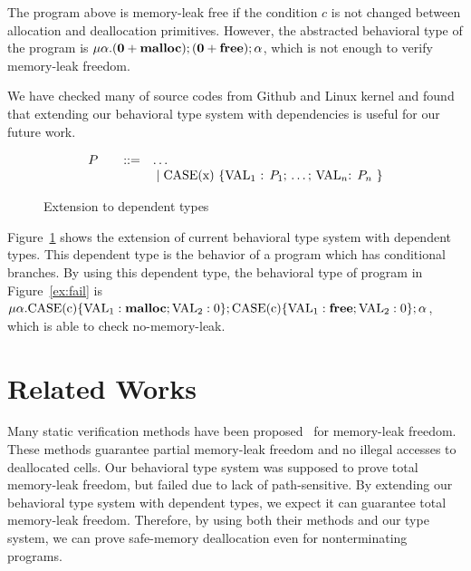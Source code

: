 \documentclass{sigplanconf}
\begin{document}
The program above is memory-leak free if the condition \(c\) is not
changed between allocation and deallocation primitives. However, the
abstracted behavioral type of the program is
\(\mu\alpha. (\mathbf{0} + \mathbf{malloc}); (\mathbf{0} + \mathbf{free}); \alpha\),
which is not enough to verify memory-leak freedom.

We have checked many of source codes from Github and Linux kernel and
found that extending our behavioral type system with dependencies is
useful for our future work.

\begin{figure}[h]
  \[
  \begin{array}{rlcl}
  P &  &::=& \ldots \\
  & & &\;|\; \mbox{CASE(x) \{VAL\(_1\) : $P_1$; \ldots ; VAL\(_n\): $P_n$  \}}\\
\end{array}
\]
\caption{Extension to dependent types}
\label{ex:beh}
\end{figure}

Figure~\ref{ex:beh} shows the extension of current behavioral type
system with dependent types. This dependent type is the behavior of a
program which has conditional branches. By using this dependent type,
the behavioral type of program in Figure~\ref{ex:fail} is
\(\mu\alpha.\mbox{CASE(c)}\{\mbox{VAL}_1:\mathbf{malloc};\mbox{VAL}_2:0
\};\mbox{CASE(c)}\{ \mbox{VAL}_1:\mathbf{free};\mbox{VAL}_2:0 \};
\alpha\), which is able to check no-memory-leak.

\section{Related Works}
Many static verification methods have been
proposed~\cite{DBLP:conf/aplas/SuenagaK09,DBLP:conf/pldi/HeineL03,DBLP:conf/sigsoft/XieA05,DBLP:journals/scp/SwamyHMGJ06,DBLP:conf/sas/OrlovichR06,DBLP:conf/issta/SuiYX12}
for memory-leak freedom. These methods guarantee partial memory-leak
freedom and no illegal accesses to deallocated cells.  Our behavioral
type system was supposed to prove total memory-leak freedom, but
failed due to lack of path-sensitive. By extending our behavioral type
system with dependent types, we expect it can guarantee total
memory-leak freedom.  Therefore, by using both their methods and our
type system, we can prove safe-memory deallocation even for
nonterminating programs.
\end{document}
